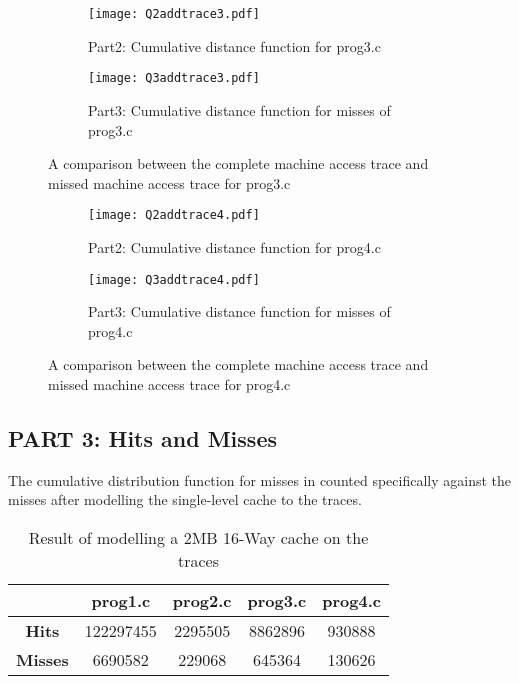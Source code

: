 \begin{figure}[H]
\centering
\begin{subfigure}{.48\textwidth}
  \centering
  \texttt{[image: Q2addtrace3.pdf]}
  \caption{Part2: Cumulative distance function for prog3.c}
  \label{fig:3sub1}
\end{subfigure}%
\hspace{2mm}
\begin{subfigure}{.465\textwidth}
  \centering
  \texttt{[image: Q3addtrace3.pdf]}
  \caption{Part3: Cumulative distance function for misses of prog3.c}
  \label{fig:3sub2}
\end{subfigure}
\caption{A comparison between the complete machine access trace and missed machine access trace for prog3.c}
\label{fig:test3}
\vspace{0.1in}
\begin{subfigure}{.48\textwidth}
  \centering
  \texttt{[image: Q2addtrace4.pdf]}
  \caption{Part2: Cumulative distance function for prog4.c}
  \label{fig:3sub3}
\end{subfigure}%
\hspace{2mm}
\begin{subfigure}{.465\textwidth}
  \centering
  \texttt{[image: Q3addtrace4.pdf]}
  \caption{Part3: Cumulative distance function for misses of prog4.c}
  \label{fig:3sub4}
\end{subfigure}
\caption{A comparison between the complete machine access trace and missed machine access trace for prog4.c}
\label{fig:test4}
\end{figure}


\newpage
\subsection*{PART 3: Hits and Misses}
The cumulative distribution function for misses in counted specifically against the misses after
modelling the single-level cache to the traces.
\begin{table}[h]
\centering
\begin{tabular}{ |c|c|c|c|c| } 
\hline
& \textbf{prog1.c} & \textbf{prog2.c} & \textbf{prog3.c} & \textbf{prog4.c} \\
\hline
\textbf{Hits}   & 122297455 & 2295505 & 8862896 & 930888 \\
\hline
\textbf{Misses} & 6690582   & 229068  & 645364  & 130626 \\
\hline
\end{tabular}
\caption{Result of modelling a 2MB 16-Way cache on the traces}
\end{table}